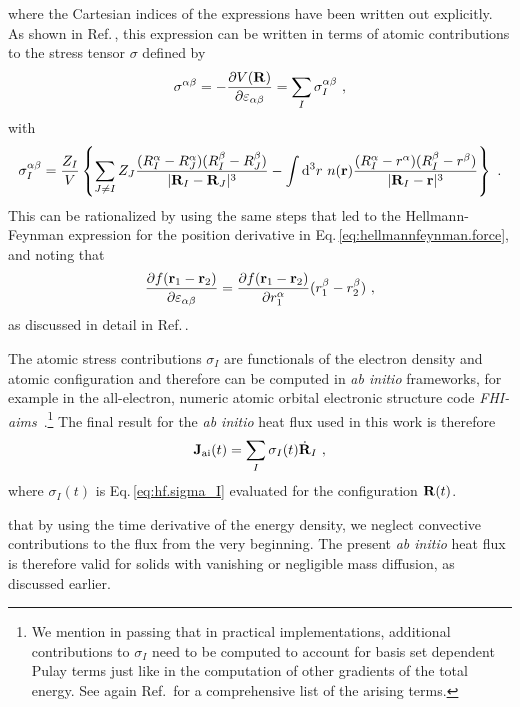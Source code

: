 where the Cartesian indices of the expressions have been written out explicitly.
As shown in Ref.\,\cite{Carbogno2016}, this expression can be written in terms of atomic contributions to the stress tensor $\sigma$ defined by
\begin{align}
  \sigma^{\alpha \beta} 
    = - \frac{\partial V ({\bf R})}{\partial \varepsilon_{\alpha \beta}}
    = \sum_I \sigma_I^{\alpha \beta}~,
  \label{eq:hf.sigma}
\end{align}
with
\begin{align}
  \sigma_I^{\alpha \beta}
    = \frac{Z_I}{V}
        \left\{ 
        \sum_{J \neq I} Z_J \frac{(R_I^\alpha - R_J^\alpha) (R_I^\beta - R_J^\beta)}{\lvert \b R_I - \b R_J \rvert^3}
        - \int \d^3 r ~ n(\b r) \frac{(R_I^\alpha - r^\alpha) (R_I^\beta - r^\beta)}{\lvert \b R_I - \b r \vert^3}
        \right\}~.
  \label{eq:hf.sigma_I}
\end{align}
%
This can be rationalized by using the same steps that led to the Hellmann-Feynman expression for the position derivative in Eq.\,\eqref{eq:hellmannfeynman.force}, and noting that
\begin{align}
  \frac{\partial f (\b r_1 - \b r_2)}{\partial \varepsilon_{\alpha \beta}}
    = \frac{\partial f (\b r_1 - \b r_2)}{\partial r_1^\alpha} (r_1^\beta - r_2 ^\beta)~,
  \label{eq:strain.derivative}
\end{align}
as discussed in detail in Ref.\,\cite{Knuth2015}. 

The atomic stress contributions $\sigma_I$ are functionals of the electron density and atomic configuration and therefore can be computed in \emph{ab initio} frameworks, for example in the all-electron, numeric atomic orbital electronic structure code \emph{FHI-aims}~\cite{FHI-aims,Knuth2015}.\footnote{We mention in passing that in practical implementations, additional contributions to $\sigma_I$ need to be computed to account for basis set dependent Pulay terms just like in the computation of other gradients of the total energy. See again Ref.\,\cite{Knuth2015} for a comprehensive list of the arising terms.} 
The final result for the \emph{ab initio} heat flux used in this work is therefore
\begin{align}
	{\bf J}_{\rm ai} (t) = \sum_I \sigma_I (t) \dot{\bf R}_I~,
	\label{eq:J_ai}
\end{align}
where $\sigma_I (t)$ is Eq.\,\eqref{eq:hf.sigma_I} evaluated for the configuration ${\bf R} (t)$.

 that by using the time derivative of the energy density, we neglect convective contributions to the flux from the very beginning. The present \emph{ab initio} heat flux is therefore valid for solids with vanishing or negligible mass diffusion, as discussed earlier.

